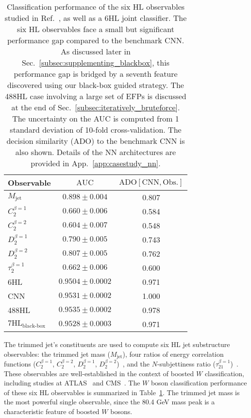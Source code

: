 \documentclass[aps,prd,twocolumn,superscriptaddress,preprintnumbers,nofootinbib,longbibliography,floatfix]{revtex4-1}
\newcommand{\CNN}{\text{CNN}}
\newcommand{\HL}{\text{HL}}
\newcommand{\ADO}{\text{ADO}}
\newcommand{\AUC}{\text{AUC}}
\newcommand{\rref}[1]{Ref.~\cite{#1}}
\newcommand{\Tab}[1]{Table~\ref{#1}}
\newcommand{\Sec}[1]{Sec.~\ref{#1}}
\newcommand{\App}[1]{App.~\ref{#1}}
\begin{document}
\begin{table}[t]
	\centering
	\begin{tabular}{lcc}
		\hline \hline
		Observable         & $\AUC$             & $\ADO[\CNN,\text{Obs.}]$ \\
		\hline \hline
		$M_{\text{jet}}$   & $0.898 \pm 0.004$  & 0.807 \\
		$C_2^{\beta=1}$    & $0.660 \pm 0.006$  & 0.584 \\
		$C_2^{\beta=2}$    & $0.604 \pm 0.007$  & 0.548 \\
		$D_2^{\beta=1}$    & $0.790 \pm 0.005$  & 0.743 \\
		$D_2^{\beta=2}$    & $0.807 \pm 0.005$  & 0.762 \\
		$\tau_2^{\beta=1}$ & $0.662 \pm 0.006$  & 0.600 \\
		\hline
		6HL                & $0.9504 \pm 0.0002$  & 0.971 \\
		CNN                & $0.9531 \pm 0.0002$  & 1.000 \\
		488HL   & $0.9535 \pm 0.0002$ & 0.978\\
		\hline
		$7\HL_{\text{black-box}}$ & $0.9528 \pm 0.0003$   & 0.971 \\
		\hline\hline
	\end{tabular}
	\caption{Classification performance of the six HL observables studied in \rref{Baldi:2016fql}, as well as a 6HL joint classifier.
	The six HL observables face a small but significant performance gap compared to the benchmark CNN. As discussed later in \Sec{subsec:supplementing_blackbox}, this performance gap is bridged by a seventh feature discovered using our black-box guided strategy.  The 488HL case involving a large set of EFPs is discussed at the end of \Sec{subsec:iteratively_bruteforce}.  The uncertainty on the AUC is computed from 1 standard deviation of 10-fold cross-validation. The decision similarity (ADO) to the benchmark CNN is also shown. Details of the NN architectures are provided in \App{app:casestudy_nn}.}
	\label{tab:AUC6HL}
\end{table}

The trimmed jet's constituents are used to compute six HL jet substructure observables:  the trimmed jet mass ($M_{\textrm{jet}}$), four ratios of energy correlation functions ($C^{\beta=1}_{2}$, $C^{\beta=2}_{2}$, $D^{\beta=1}_{2}$, $D^{\beta=2}_{2}$)~\cite{Larkoski:2013eya,Larkoski:2014gra}, and
the $N$-subjettiness ratio ($\tau^{\beta=1}_{21}$)~\cite{Thaler:2010tr,Thaler:2011gf}. These observables are well-established in the context of boosted $W$ classification, including studies at ATLAS~\cite{Aad:2015rpa,Aaboud:2018psm} and CMS~\cite{Khachatryan:2014vla}. The $W$ boson classification performance of these six HL observables is summarized in \Tab{tab:AUC6HL}. The trimmed jet mass is the most powerful single observable, since the 80.4 GeV mass peak is a characteristic feature of boosted $W$ bosons.
\end{document}
